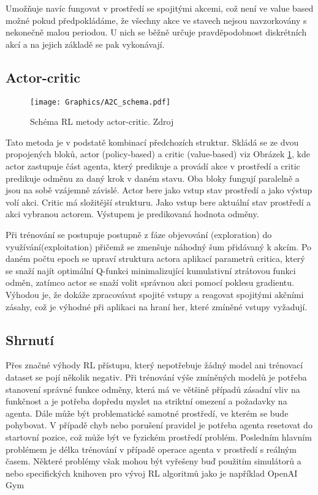 \documentclass[czech, bc, kky, he, iso690numb]{fasthesis}
\begin{document}
	            Umožňuje navíc fungovat v prostředí se spojitými akcemi, což není ve value based možné pokud předpokládáme, že všechny akce ve stavech nejsou navzorkovány s nekonečně malou periodou. U nich se běžně určuje pravděpodobnost diskrétních akcí a na jejich základě se pak vykonávají.
            
            \subsection{Actor-critic}
            		
            		\begin{figure}[h]
            			\centering
            			\texttt{[image: Graphics/A2C\_schema.pdf]}
            			\caption{Schéma RL metody actor-critic. Zdroj \cite{autopilot}}
            			\label{pic:actor_critic}
            		\end{figure}
            		
	            Tato metoda je v podstatě kombinací předchozích struktur. Skládá se ze dvou propojených bloků, actor (policy-based) a critic (value-based) viz Obrázek \ref{pic:actor_critic}, kde actor zastupuje část agenta, který predikuje a provádí akce v prostředí a critic predikuje odměnu za daný krok v daném stavu. Oba bloky fungují paralelně a jsou na sobě vzájemně závislé. Actor bere jako vstup stav prostředí a jako výstup volí akci. Critic má složitější strukturu. Jako vstup bere aktuální stav prostředí a akci vybranou actorem. Výstupem je predikovaná hodnota odměny.
	            
	            Při trénování se postupuje postupně z fáze objevování (exploration) do využívání(exploitation) přičemž se zmenšuje náhodný šum přidávaný k akcím. Po daném počtu epoch se upraví struktura actora aplikací parametrů critica, který se snaží najít optimální Q-funkci minimalizující kumulativní ztrátovou funkci odměn, zatímco actor se snaží volit správnou akci pomocí poklesu gradientu. Výhodou je, že dokáže zpracovávat spojité vstupy a reagovat spojitými akčními zásahy, což je výhodné při aplikaci na hraní her, které zmíněné vstupy vyžadují.
	            
        	\subsection{Shrnutí}
        		Přes značné výhody RL přístupu, který nepotřebuje žádný model ani trénovací dataset se pojí několik negativ. Při trénování výše zmíněných modelů je potřeba stanovení správné funkce odměny, která má ve většině případů zásadní vliv na funkčnost a je potřeba dopředu myslet na striktní omezení a požadavky na agenta. Dále může být problematické samotné prostředí, ve kterém se bude pohybovat. V případě chyb nebo porušení pravidel je potřeba agenta resetovat do startovní pozice, což může být ve fyzickém prostředí problém. Posledním hlavním problémem je délka trénování v případě operace agenta v prostředí s reálným časem. Některé problémy však mohou být vyřešeny buď použitím simulátorů a nebo specifických knihoven pro vývoj RL algoritmů jako je například OpenAI Gym \cite{openai_gym}
            
\end{document}
